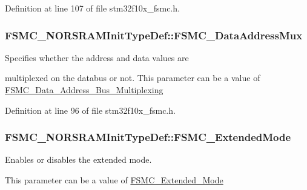Definition at line 107 of file stm32f10x\-\_\-fsmc.\-h.

\hypertarget{struct_f_s_m_c___n_o_r_s_r_a_m_init_type_def_af4ff95085d3bb39e34c2f88ca3140ce5}{
\subsubsection[{F\-S\-M\-C\-\_\-\-Data\-Address\-Mux}]{ F\-S\-M\-C\-\_\-\-N\-O\-R\-S\-R\-A\-M\-Init\-Type\-Def\-::\-F\-S\-M\-C\-\_\-\-Data\-Address\-Mux}}\label{struct_f_s_m_c___n_o_r_s_r_a_m_init_type_def_af4ff95085d3bb39e34c2f88ca3140ce5}
\begin{DoxyVerb}      Specifies whether the address and data values are
\end{DoxyVerb}
 multiplexed on the databus or not. This parameter can be a value of \hyperlink{group___f_s_m_c___data___address___bus___multiplexing}{F\-S\-M\-C\-\_\-\-Data\-\_\-\-Address\-\_\-\-Bus\-\_\-\-Multiplexing} 

Definition at line 96 of file stm32f10x\-\_\-fsmc.\-h.

\hypertarget{struct_f_s_m_c___n_o_r_s_r_a_m_init_type_def_af33d0076b5bfea3a66e388ed7f3eb3f3}{
\subsubsection[{F\-S\-M\-C\-\_\-\-Extended\-Mode}]{ F\-S\-M\-C\-\_\-\-N\-O\-R\-S\-R\-A\-M\-Init\-Type\-Def\-::\-F\-S\-M\-C\-\_\-\-Extended\-Mode}}\label{struct_f_s_m_c___n_o_r_s_r_a_m_init_type_def_af33d0076b5bfea3a66e388ed7f3eb3f3}
\begin{DoxyVerb}        Enables or disables the extended mode.
\end{DoxyVerb}
 This parameter can be a value of \hyperlink{group___f_s_m_c___extended___mode}{F\-S\-M\-C\-\_\-\-Extended\-\_\-\-Mode} 


